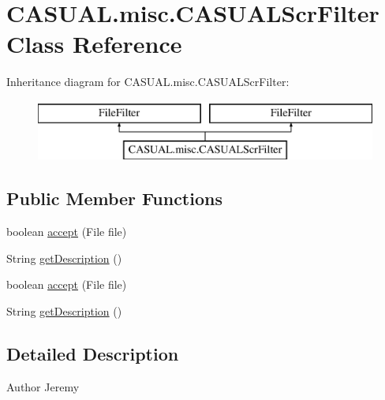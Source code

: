 \hypertarget{class_c_a_s_u_a_l_1_1misc_1_1_c_a_s_u_a_l_scr_filter}{\section{C\-A\-S\-U\-A\-L.\-misc.\-C\-A\-S\-U\-A\-L\-Scr\-Filter Class Reference}
\label{class_c_a_s_u_a_l_1_1misc_1_1_c_a_s_u_a_l_scr_filter}
}
Inheritance diagram for C\-A\-S\-U\-A\-L.\-misc.\-C\-A\-S\-U\-A\-L\-Scr\-Filter\-:\begin{figure}[H]
\begin{center}
\leavevmode
\includegraphics[height=2.000000cm]{class_c_a_s_u_a_l_1_1misc_1_1_c_a_s_u_a_l_scr_filter}
\end{center}
\end{figure}
\subsection*{Public Member Functions}
\begin{DoxyCompactItemize}
\item 
boolean \hyperlink{class_c_a_s_u_a_l_1_1misc_1_1_c_a_s_u_a_l_scr_filter_ac0849a3d91971a8c385078a046ce91b0}{accept} (File file)
\item 
String \hyperlink{class_c_a_s_u_a_l_1_1misc_1_1_c_a_s_u_a_l_scr_filter_abf2196797a290d8b2666468c5ae2e628}{get\-Description} ()
\item 
boolean \hyperlink{class_c_a_s_u_a_l_1_1misc_1_1_c_a_s_u_a_l_scr_filter_ac0849a3d91971a8c385078a046ce91b0}{accept} (File file)
\item 
String \hyperlink{class_c_a_s_u_a_l_1_1misc_1_1_c_a_s_u_a_l_scr_filter_abf2196797a290d8b2666468c5ae2e628}{get\-Description} ()
\end{DoxyCompactItemize}


\subsection{Detailed Description}
\begin{DoxyAuthor}{Author}
Jeremy 
\end{DoxyAuthor}


